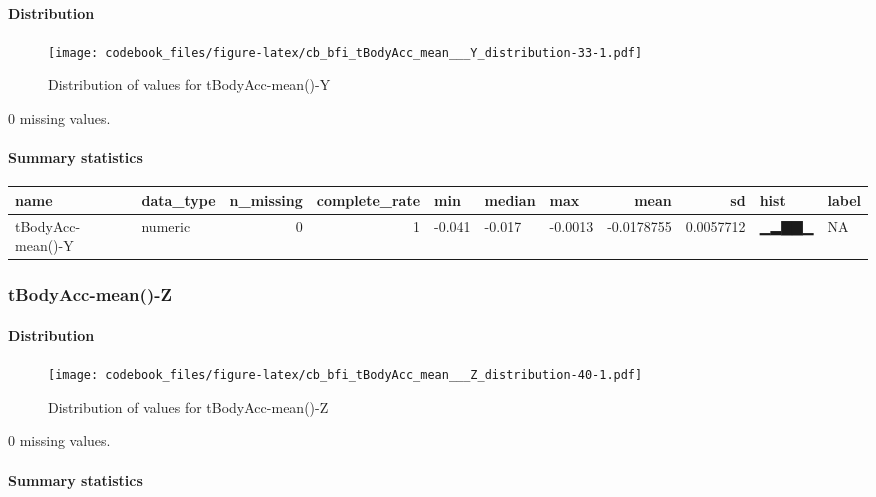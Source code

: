 \documentclass[
]{article}
\begin{document}
\hypertarget{tBodyAcc_mean___Y_distribution}{%
\paragraph{Distribution}\label{tBodyAcc_mean___Y_distribution}}

\begin{figure}
\centering
\texttt{[image: codebook\_files/figure-latex/cb\_bfi\_tBodyAcc\_mean\_\_\_Y\_distribution-33-1.pdf]}
\caption{Distribution of values for tBodyAcc-mean()-Y}
\end{figure}

0 missing values.

\hypertarget{tBodyAcc_mean___Y_summary}{%
\paragraph{Summary statistics}\label{tBodyAcc_mean___Y_summary}}

\begin{longtable}[]{@{}llrrlllrrll@{}}
\toprule
name & data\_type & n\_missing & complete\_rate & min & median & max &
mean & sd & hist & label \\
\midrule
\endhead
tBodyAcc-mean()-Y & numeric & 0 & 1 & -0.041 & -0.017 & -0.0013 &
-0.0178755 & 0.0057712 & ▁▂▇▇▁ & NA \\
\bottomrule
\end{longtable}

\hypertarget{tBodyAcc_mean___Z}{%
\subsubsection{tBodyAcc-mean()-Z}\label{tBodyAcc_mean___Z}}

\hypertarget{tBodyAcc_mean___Z_distribution}{%
\paragraph{Distribution}\label{tBodyAcc_mean___Z_distribution}}

\begin{figure}
\centering
\texttt{[image: codebook\_files/figure-latex/cb\_bfi\_tBodyAcc\_mean\_\_\_Z\_distribution-40-1.pdf]}
\caption{Distribution of values for tBodyAcc-mean()-Z}
\end{figure}

0 missing values.

\hypertarget{tBodyAcc_mean___Z_summary}{%
\paragraph{Summary statistics}\label{tBodyAcc_mean___Z_summary}}
\end{document}

